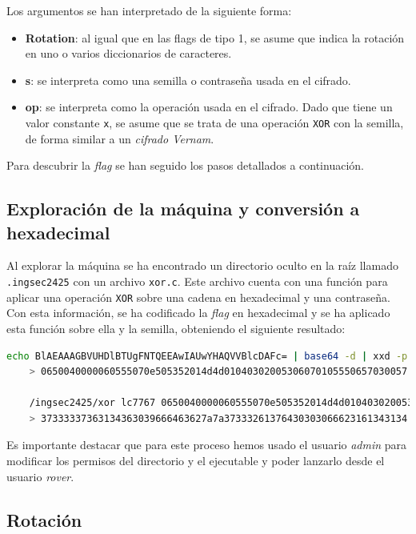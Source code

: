 \documentclass[]{article}
\begin{document}
Los argumentos se han interpretado de la siguiente forma:
\begin{itemize}
    \item \textbf{Rotation}: al igual que en las flags de tipo 1, se asume que indica la rotación en uno o varios diccionarios de caracteres.
    \item \textbf{s}: se interpreta como una semilla o contraseña usada en el cifrado.
    \item \textbf{op}: se interpreta como la operación usada en el cifrado.
    Dado que tiene un valor constante \texttt{x}, se asume que se trata de una operación \texttt{XOR} con la semilla, de forma similar a un \textit{cifrado Vernam}. 
\end{itemize}

Para descubrir la \textit{flag} se han seguido los pasos detallados a continuación.

\subsection{Exploración de la máquina y conversión a hexadecimal}

Al explorar la máquina se ha encontrado un directorio oculto en la raíz llamado \texttt{.ingsec2425} con un archivo \texttt{xor.c}. Este archivo cuenta con una función para aplicar una operación \texttt{XOR} sobre una cadena en hexadecimal y una contraseña. Con esta información, se ha codificado la \textit{flag} en hexadecimal y se ha aplicado esta función sobre ella y la semilla, obteniendo el siguiente resultado:

\lstset{style=bash}
\begin{lstlisting}[language=bash, caption=XOR sobre la flag]
    echo BlAEAAAGBVUHDlBTUgFNTQEEAwIAUwYHAQVVBlcDAFc= | base64 -d | xxd -p 
    > 0650040000060555070e505352014d4d01040302005306070105550657030057 # flag en hex

    /ingsec2425/xor lc7767 0650040000060555070e505352014d4d01040302005306070105550657030057
    > 37333337363134363039666463627a7a37333261376430303066623161343134
\end{lstlisting}

Es importante destacar que para este proceso hemos usado el usuario \textit{admin} para modificar los permisos del directorio y el ejecutable y poder lanzarlo desde el usuario \textit{rover}.

\subsection{Rotación}
\end{document}
